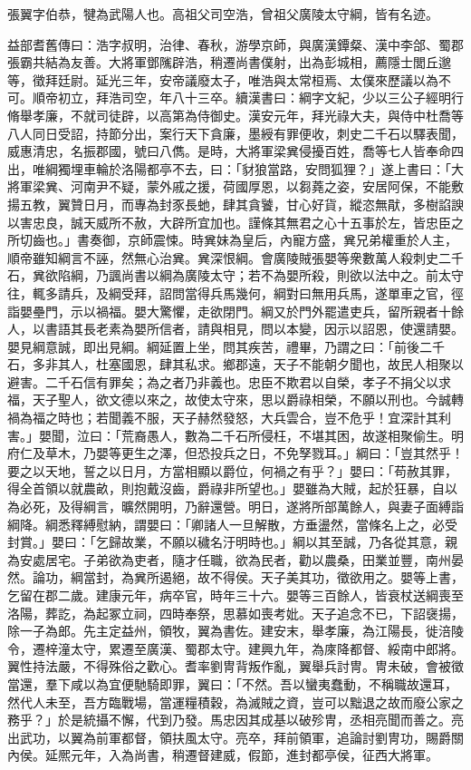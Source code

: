 
\begin{pinyinscope}
張翼字伯恭，犍為武陽人也。高祖父司空浩，曾祖父廣陵太守綱，皆有名迹。

益部耆舊傳曰：浩字叔明，治律、春秋，游學京師，與廣漢鐔粲、漢中李郃、蜀郡張霸共結為友善。大將軍鄧隲辟浩，稍遷尚書僕射，出為彭城相，薦隱士閭丘邈等，徵拜廷尉。延光三年，安帝議廢太子，唯浩與太常桓焉、太僕來歷議以為不可。順帝初立，拜浩司空，年八十三卒。續漢書曰：綱字文紀，少以三公子經明行脩舉孝廉，不就司徒辟，以高第為侍御史。漢安元年，拜光祿大夫，與侍中杜喬等八人同日受詔，持節分出，案行天下貪廉，墨綬有罪便收，刺史二千石以驛表聞，威惠清忠，名振郡國，號曰八儁。是時，大將軍梁兾侵擾百姓，喬等七人皆奉命四出，唯綱獨埋車輪於洛陽都亭不去，曰：「豺狼當路，安問狐狸？」遂上書曰：「大將軍梁兾、河南尹不疑，蒙外戚之援，荷國厚恩，以芻蕘之姿，安居阿保，不能敷揚五教，翼贊日月，而專為封豕長虵，肆其貪饕，甘心好貨，縱恣無猒，多樹諂諛以害忠良，誠天威所不赦，大辟所宜加也。謹條其無君之心十五事於左，皆忠臣之所切齒也。」書奏御，京師震悚。時兾妹為皇后，內寵方盛，兾兄弟權重於人主，順帝雖知綱言不誣，然無心治兾。兾深恨綱。會廣陵賊張嬰等衆數萬人殺刺史二千石，兾欲陷綱，乃諷尚書以綱為廣陵太守；若不為嬰所殺，則欲以法中之。前太守往，輒多請兵，及綱受拜，詔問當得兵馬幾何，綱對曰無用兵馬，遂單車之官，徑詣嬰壘門，示以禍福。嬰大驚懼，走欲閉門。綱又於門外罷遣吏兵，留所親者十餘人，以書語其長老素為嬰所信者，請與相見，問以本變，因示以詔恩，使還請嬰。嬰見綱意誠，即出見綱。綱延置上坐，問其疾苦，禮畢，乃謂之曰：「前後二千石，多非其人，杜塞國恩，肆其私求。鄉郡遠，天子不能朝夕聞也，故民人相聚以避害。二千石信有罪矣；為之者乃非義也。忠臣不欺君以自榮，孝子不捐父以求福，天子聖人，欲文德以來之，故使太守來，思以爵祿相榮，不願以刑也。今誠轉禍為福之時也；若聞義不服，天子赫然發怒，大兵雲合，豈不危乎！宜深計其利害。」嬰聞，泣曰：「荒裔愚人，數為二千石所侵枉，不堪其困，故遂相聚偷生。明府仁及草木，乃嬰等更生之澤，但恐投兵之日，不免孥戮耳。」綱曰：「豈其然乎！要之以天地，誓之以日月，方當相顯以爵位，何禍之有乎？」嬰曰：「苟赦其罪，得全首領以就農畝，則抱戴沒齒，爵祿非所望也。」嬰雖為大賊，起於狂暴，自以為必死，及得綱言，曠然開明，乃辭還營。明日，遂將所部萬餘人，與妻子面縛詣綱降。綱悉釋縛慰納，謂嬰曰：「卿諸人一旦解散，方垂盪然，當條名上之，必受封賞。」嬰曰：「乞歸故業，不願以穢名汙明時也。」綱以其至誠，乃各從其意，親為安處居宅。子弟欲為吏者，隨才任職，欲為民者，勸以農桑，田業並豐，南州晏然。論功，綱當封，為兾所遏絕，故不得侯。天子美其功，徵欲用之。嬰等上書，乞留在郡二歲。建康元年，病卒官，時年三十六。嬰等三百餘人，皆衰杖送綱喪至洛陽，葬訖，為起冢立祠，四時奉祭，思慕如喪考妣。天子追念不已，下詔襃揚，除一子為郎。先主定益州，領牧，翼為書佐。建安末，舉孝廉，為江陽長，徙涪陵令，遷梓潼太守，累遷至廣漢、蜀郡太守。建興九年，為庲降都督、綏南中郎將。翼性持法嚴，不得殊俗之歡心。耆率劉冑背叛作亂，翼舉兵討冑。冑未破，會被徵當還，羣下咸以為宜便馳騎即罪，翼曰：「不然。吾以蠻夷蠢動，不稱職故還耳，然代人未至，吾方臨戰場，當運糧積穀，為滅賊之資，豈可以黜退之故而廢公家之務乎？」於是統攝不懈，代到乃發。馬忠因其成基以破殄冑，丞相亮聞而善之。亮出武功，以翼為前軍都督，領扶風太守。亮卒，拜前領軍，追論討劉冑功，賜爵關內侯。延熈元年，入為尚書，稍遷督建威，假節，進封都亭侯，征西大將軍。


\end{pinyinscope}
